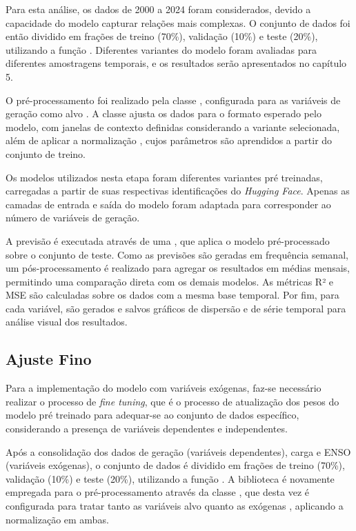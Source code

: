 Para esta análise, os dados de 2000 a 2024 foram considerados, devido a capacidade do modelo capturar relações mais complexas. 
O conjunto de dados foi então dividido em frações de treino (70\%), validação (10\%) e teste (20\%), utilizando a função 
. Diferentes variantes do modelo foram avaliadas para diferentes amostragens temporais, e os resultados 
serão apresentados no capítulo 5.

O pré-processamento foi realizado pela classe , configurada para as variáveis de geração como 
alvo . A classe ajusta os dados para o formato esperado pelo modelo, com janelas de contexto definidas
considerando a variante selecionada, além de aplicar a normalização , cujos parâmetros são aprendidos 
a partir do conjunto de treino.

Os modelos  utilizados nesta etapa foram diferentes variantes pré treinadas, carregadas a partir
de suas respectivas identificações do \textit{Hugging Face}. Apenas as camadas de entrada e saída do modelo foram adaptada 
para corresponder ao número de variáveis de geração.

A previsão é executada através de uma , que aplica o modelo pré-processado sobre o conjunto 
de teste. Como as previsões são geradas em frequência semanal, um pós-processamento é realizado para agregar os resultados em 
médias mensais, permitindo uma comparação direta com os demais modelos. As métricas R² e MSE são calculadas sobre os dados 
com a mesma base temporal. Por fim, para cada variável, são gerados e salvos gráficos de dispersão e de série temporal para 
análise visual dos resultados.


\subsection{Ajuste Fino} %
Para a implementação do modelo com variáveis exógenas, faz-se necessário realizar o processo de \textit{fine tuning}, que 
é o processo de atualização dos pesos do modelo pré treinado para adequar-se ao conjunto de dados específico, considerando
a presença de variáveis dependentes e independentes.

Após a consolidação dos dados de geração (variáveis dependentes), carga e ENSO (variáveis exógenas), o conjunto de dados é dividido em frações de treino (70\%), validação 
(10\%) e teste (20\%), utilizando a função . A biblioteca  é novamente empregada 
para o pré-processamento através da classe , que desta vez é configurada para tratar tanto as variáveis 
alvo  quanto as exógenas , aplicando a normalização  em ambas.

